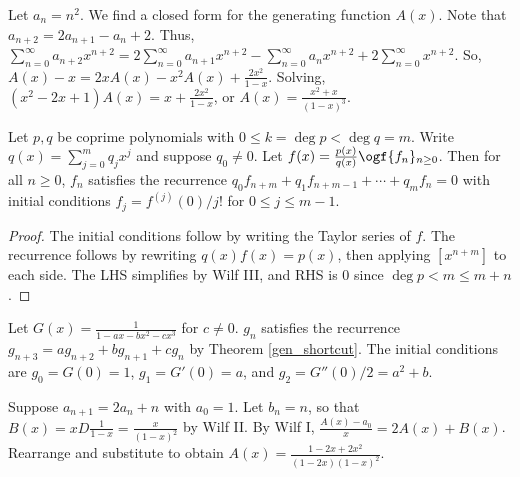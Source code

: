 \documentclass[a4paper]{article}
\begin{document}
\begin{example}\label{nsqgen}
Let $a_n=n^2$. We find a closed form for the generating function $A(x)$. Note that $a_{n+2}=2a_{n+1}-a_{n}+2$. Thus, $\sum_{n=0}^\infty a_{n+2}x^{n+2}=2\sum_{n=0}^\infty a_{n+1}x^{n+2}-\sum_{n=0}^\infty a_nx^{n+2}+2\sum_{n=0}^\infty x^{n+2}$. So, $A(x)-x=2xA(x)-x^2A(x)+\frac{2x^2}{1-x}$. Solving, $(x^2-2x+1)A(x)=x+\frac{2x^2}{1-x}$, or $A(x)=\frac{x^2+x}{(1-x)^3}$.
\end{example}

\begin{theorem}\label{gen_shortcut}
Let $p,q$ be coprime polynomials with $0\leq k=\deg p<\deg q=m$. Write $q(x)=\sum_{j=0}^mq_jx^j$ and suppose $q_0\neq0$. Let $f(x)=\frac{p(x)}{q(x)}\ogf \{f_n\}_{n\geq0}$. Then for all $n\geq0$, $f_n$ satisfies the recurrence $q_0f_{n+m}+q_1f_{n+m-1}+\cdots+q_mf_n=0$ with initial conditions $f_j=f^{(j)}(0)/j!$ for $0\leq j\leq m-1$.

\begin{hl}
\begin{proof}
The initial conditions follow by writing the Taylor series of $f$. The recurrence follows by rewriting $q(x)f(x)=p(x)$, then applying $[x^{n+m}]$ to each side. The LHS simplifies by Wilf III, and RHS is 0 since $\deg p<m\leq m+n$.
\end{proof}
\end{hl}
\end{theorem}

\begin{example}
Let $G(x)=\frac1{1-ax-bx^2-cx^3}$ for $c\neq0$. $g_n$ satisfies the recurrence $g_{n+3}=ag_{n+2}+bg_{n+1}+cg_n$ by Theorem \ref{gen_shortcut}. The initial conditions are $g_0=G(0)=1$, $g_1=G'(0)=a$, and $g_2=G''(0)/2=a^2+b$.
\end{example}

\begin{example}
Suppose $a_{n+1}=2a_n+n$ with $a_0=1$. Let $b_n=n$, so that $\displaystyle B(x)=xD\frac1{1-x}=\frac x{(1-x)^2}$ by Wilf II. By Wilf I, $\frac{A(x)-a_0}x=2A(x)+B(x)$. Rearrange and substitute to obtain $A(x)=\frac{1-2x+2x^2}{(1-2x)(1-x)^2}$.
\end{example}
\end{document}
